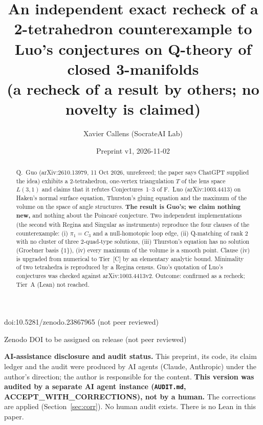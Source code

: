 \documentclass[10pt]{article}
\title{An independent exact recheck of a 2-tetrahedron counterexample to Luo's conjectures on Q-theory of closed 3-manifolds\\
{\large (a recheck of a result by others; no novelty is claimed)}}
\author{Xavier Callens (SocrateAI Lab)}
\date{Preprint v1, 2026-11-02}
\newcommand{\tier}[1]{\textsf{[#1]}}
\newcommand{\tC}{\tier{C}}
\begin{document}
\maketitle
\begin{center}\small doi:10.5281/zenodo.23867965 \quad (not peer reviewed)\end{center}

\begin{center}\small Zenodo DOI to be assigned on release \quad (not peer reviewed)\end{center}

\noindent\textbf{AI-assistance disclosure and audit status.} This preprint, its code, its claim ledger and the audit were produced by AI agents (Claude, Anthropic) under the author's direction; the author is responsible for the content.
\textbf{This version was audited by a separate AI agent instance (\texttt{AUDIT.md}, ACCEPT\_WITH\_CORRECTIONS), not by a human.} The corrections are applied (Section~\ref{sec:corr}). No human audit exists. There is no Lean in this paper.

\begin{abstract}
\noindent Q.~Guo \cite{guo} (arXiv:2610.13979, 11 Oct 2026, unrefereed; the paper says ChatGPT supplied the idea) exhibits a $2$-tetrahedron, one-vertex triangulation $T$ of the lens space $L(3,1)$ and claims that it refutes Conjectures~1--3 of F.~Luo \cite{luo} (arXiv:1003.4413) on Haken's normal surface equation, Thurston's gluing equation and the maximum of the volume on the space of angle structures. \textbf{The result is Guo's; we claim nothing new,} and nothing about the Poincar\'e conjecture. Two independent implementations (the second with Regina and Singular as instruments) reproduce the four clauses of the counterexample: (i) $\pi_1=C_3$ and a null-homotopic loop edge, (ii) Q-matching of rank $2$ with no cluster of three $2$-quad-type solutions, (iii) Thurston's equation has no solution (Groebner basis $\{1\}$), (iv) every maximum of the volume is a smooth point. Clause (iv) is upgraded from numerical to Tier~\tC{} by an elementary analytic bound. Minimality of two tetrahedra is reproduced by a Regina census. Guo's quotation of Luo's conjectures was checked against arXiv:1003.4413v2. Outcome: confirmed as a recheck; Tier~A (Lean) not reached.
\end{abstract}

\noindent{}
\end{document}
